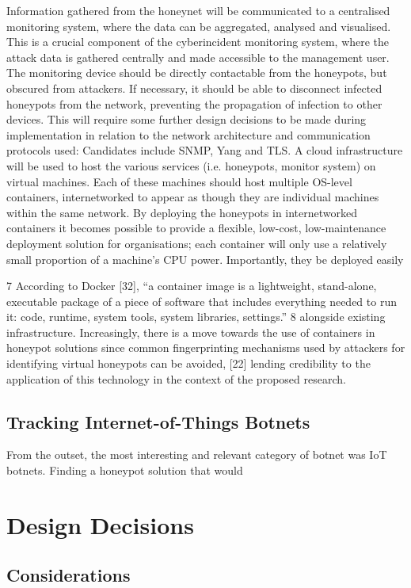 Information gathered from the honeynet will be communicated to a centralised monitoring system,
where the data can be aggregated, analysed and visualised. This is a crucial component of the cyberincident
monitoring system, where the attack data is gathered centrally and made accessible to the
management user. The monitoring device should be directly contactable from the honeypots, but
obscured from attackers. If necessary, it should be able to disconnect infected honeypots from the
network, preventing the propagation of infection to other devices. This will require some further
design decisions to be made during implementation in relation to the network architecture and
communication protocols used: Candidates include SNMP, Yang and TLS.
A cloud infrastructure will be used to host the various services (i.e. honeypots, monitor system) on
virtual machines. Each of these machines should host multiple OS-level containers, internetworked
to appear as though they are individual machines within the same network.
By deploying the honeypots in internetworked containers it becomes possible to provide a flexible,
low-cost, low-maintenance deployment solution for organisations; each container will only use a
relatively small proportion of a machine’s CPU power. Importantly, they be deployed easily

7 According to Docker [32], “a container image is a lightweight, stand-alone, executable package of a piece of
software that includes everything needed to run it: code, runtime, system tools, system libraries, settings.”
8
alongside existing infrastructure. Increasingly, there is a move towards the use of containers in
honeypot solutions since common fingerprinting mechanisms used by attackers for identifying
virtual honeypots can be avoided, [22] lending credibility to the application of this technology in the
context of the proposed research.


\subsection{Tracking Internet-of-Things Botnets}

From the outset, the most interesting and relevant category of botnet was IoT botnets. Finding a honeypot solution that would

\section{Design Decisions}
	\subsection{Considerations}
